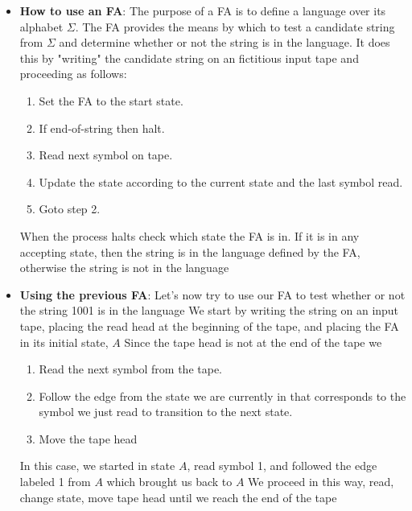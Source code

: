 \documentclass{report}
\begin{document}
\begin{itemize}
\begin{itemize}
            \end{itemize}
        \item \textbf{How to use an FA}: The purpose of a FA is to define a language over its alphabet $\Sigma$. The FA provides the means by which to test a candidate string from $\Sigma$ and determine whether or not the string is in the language. It does this by "writing" the candidate string on an fictitious input tape and proceeding as follows:
        \begin{enumerate}
            \item Set the FA to the start state.
            \item If end-of-string then halt.
            \item Read next symbol on tape.
            \item Update the state according to the current state and the last symbol read.
            \item Goto step 2.
        \end{enumerate}
        When the process halts check which state the FA is in. If it is in any accepting state, then the string is in the language defined by the FA, otherwise the string is not in the language
    \item \textbf{Using the previous FA}: Let's now try to use our FA to test whether or not the string 1001 is in the language
        \bigbreak \noindent 
        We start by writing the string on an input tape, placing the read head at the beginning of the tape, and placing the FA in its initial state, $A$
        \bigbreak \noindent 
        \bigbreak \noindent 
        Since the tape head is not at the end of the tape we
        \begin{enumerate}
            \item Read the next symbol from the tape.
            \item Follow the edge from the state we are currently in that corresponds to the symbol we just read to transition to the next state.
            \item Move the tape head
        \end{enumerate}
        \bigbreak \noindent 
        \bigbreak \noindent 
        In this case, we started in state $A$, read symbol 1, and followed the edge labeled 1 from $A$ which brought us back to $A$
        \bigbreak \noindent 
        We proceed in this way, read, change state, move tape head until we reach the end of the tape
        \bigbreak \noindent 

\end{itemize}
\end{document}

